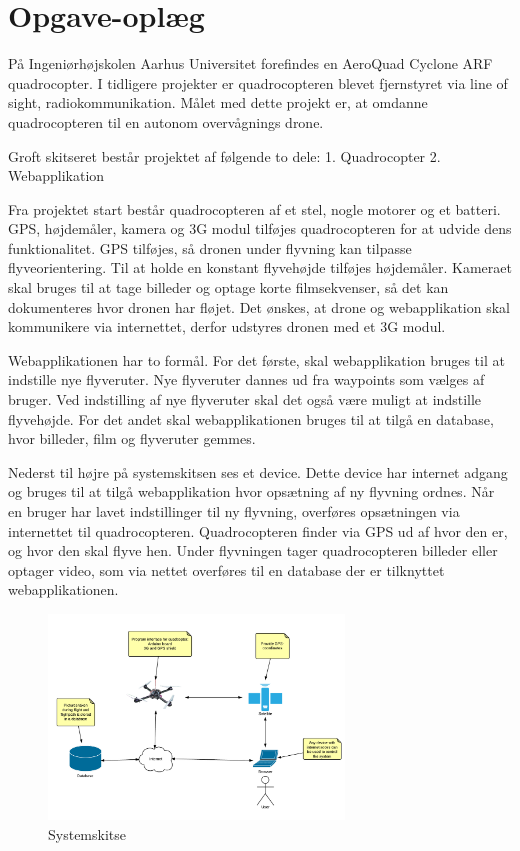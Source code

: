 \chapter{Opgave-oplæg}

\vspace{-20pt}

På Ingeniørhøjskolen Aarhus Universitet forefindes en AeroQuad Cyclone ARF quadrocopter. I tidligere projekter er quadrocopteren blevet fjernstyret via line of sight, radiokommunikation. Målet med dette projekt er, at omdanne quadrocopteren til en autonom overvågnings drone.

Groft skitseret består projektet af følgende to dele: 
1. Quadrocopter
2. Webapplikation

Fra projektet start består quadrocopteren af et stel, nogle motorer og et batteri. GPS, højdemåler, kamera og 3G modul tilføjes quadrocopteren for at udvide dens funktionalitet. GPS tilføjes, så dronen under flyvning kan tilpasse flyveorientering. Til at holde en konstant flyvehøjde tilføjes højdemåler. Kameraet skal bruges til at tage billeder og optage korte filmsekvenser, så det kan dokumenteres hvor dronen har fløjet. Det ønskes, at drone og webapplikation skal kommunikere via internettet, derfor udstyres dronen med et 3G modul.

Webapplikationen har to formål. For det første, skal webapplikation bruges til at indstille nye flyveruter. Nye flyveruter dannes ud fra waypoints som vælges af bruger. Ved indstilling af nye flyveruter skal det også være muligt at indstille flyvehøjde. For det andet skal webapplikationen bruges til at tilgå en database, hvor billeder, film og flyveruter gemmes.

Nederst til højre på systemskitsen ses et device. Dette device har internet adgang og bruges til at tilgå webapplikation hvor opsætning af ny flyvning ordnes.  Når en bruger har lavet indstillinger til ny flyvning, overføres opsætningen via internettet til quadrocopteren. Quadrocopteren finder via GPS ud af hvor den er, og hvor den skal flyve hen. Under flyvningen tager quadrocopteren billeder eller optager video, som via nettet overføres til en database der er tilknyttet webapplikationen.

\vspace{-5pt}
\begin{figure}[H]
\centering
\includegraphics[width=0.7\textwidth]{Billeder/Projektbeskrivelse.png}
\vspace{-5pt}
\caption{Systemskitse}
\label{fig:Systemskitse}
\end{figure}